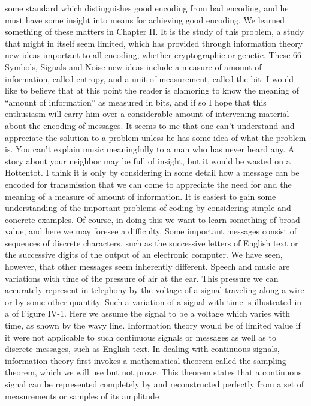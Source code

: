 some standard which distinguishes good encoding from bad encoding,
and he must have some insight into means for achieving good
encoding. We learned something of these matters in Chapter II.
It is the study of this problem, a study that might in itself seem
limited, which has provided through information theory new ideas
important to all encoding, whether cryptographic or genetic. These
66
Symbols, Signals and Noise
new ideas include a measure of amount of information, called
entropy, and a unit of measurement, called the bit.
I would like to believe that at this point the reader is clamoring
to know the meaning of “amount of information” as measured in
bits, and if so I hope that this enthusiasm will carry him over a
considerable amount of intervening material about the encoding
of messages.
It seems to me that one can’t understand and appreciate the
solution to a problem unless he has some idea of what the problem
is. You can’t explain music meaningfully to a man who has never
heard any. A story about your neighbor may be full of insight, but
it would be wasted on a Hottentot. I think it is only by considering
in some detail how a message can be encoded for transmission that
we can come to appreciate the need for and the meaning of a
measure of amount of information.
It is easiest to gain some understanding of the important problems
of coding by considering simple and concrete examples. Of
course, in doing this we want to learn something of broad value,
and here we may foresee a difficulty.
Some important messages consist of sequences of discrete characters,
such as the successive letters of English text or the successive
digits of the output of an electronic computer. We have seen,
however, that other messages seem inherently different.
Speech and music are variations with time of the pressure of air
at the ear. This pressure we can accurately represent in telephony
by the voltage of a signal traveling along a wire or by some other
quantity. Such a variation of a signal with time is illustrated in a
of Figure IV-1. Here we assume the signal to be a voltage which
varies with time, as shown by the wavy line.
Information theory would be of limited value if it were not
applicable to such continuous signals or messages as well as to
discrete messages, such as English text.
In dealing with continuous signals, information theory first
invokes a mathematical theorem called the sampling theorem,
which we will use but not prove. This theorem states that a continuous
signal can be represented completely by and reconstructed
perfectly from a set of measurements or samples of its amplitude
